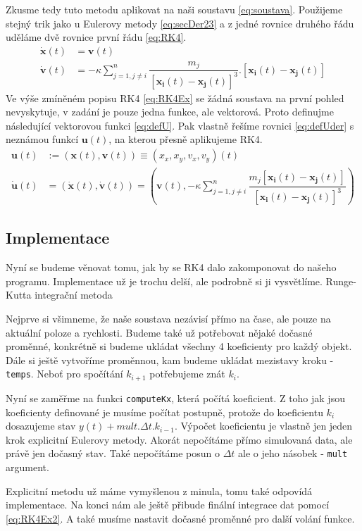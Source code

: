 Zkusme tedy tuto metodu aplikovat na naši soustavu \eqref{eq:soustava}. Použijeme stejný trik jako u Eulerovy metody \eqref{eq:secDer23} a z jedné rovnice druhého řádu uděláme dvě rovnice první řádu \eqref{eq:RK4}.
\begin{subequations}
	\label{eq:RK4}
	\begin{align}
	\label{eq:RK4pos}
	\dot{\boldsymbol{x}}(t)&=\boldsymbol{v}(t)\\
	\label{eq:RK4vel}
	\dot{\boldsymbol{v}}(t)&=-  \kappa \sum_{j=1,j \neq i}^{n}\dfrac{m_j}
	{\left[ \boldsymbol{x_i}(t) - \boldsymbol{x_j}(t)\right] ^3} . 
	\left[ \boldsymbol{x_i}(t) - \boldsymbol{x_j}(t)\right] 
	\end{align}
\end{subequations}
Ve výše zmíněném popisu RK4 \eqref{eq:RK4Ex} se žádná soustava na první pohled nevyskytuje, v zadání je pouze jedna funkce, ale vektorová. Proto definujme následující vektorovou funkci \eqref{eq:defU}. Pak vlastně řešíme rovnici \eqref{eq:defUder} s neznámou funkcí $ \boldsymbol{u}(t) $, na kterou přesně aplikujeme RK4.
\begin{align}
	\label{eq:defU}
	\boldsymbol{u}(t) &:= (\boldsymbol{x}(t),\boldsymbol{v}(t)) \equiv(x_x,x_y,v_x,v_y)(t)\\
	\label{eq:defUder}
	 \boldsymbol{\dot{u}}(t)&=(\dot{\boldsymbol{x}}(t),\dot{\boldsymbol{v}}(t))=
	 (\boldsymbol{v}(t), -\kappa \sum_{j=1,j \neq i}^{n}\dfrac{m_j\left[ \boldsymbol{x_i}(t) - \boldsymbol{x_j}(t)\right]}
	 {\left[ \boldsymbol{x_i}(t) - \boldsymbol{x_j}(t)\right] ^3}
	  )
\end{align}


\subsection{Implementace}
Nyní se budeme věnovat tomu, jak by se RK4 dalo zakomponovat do našeho programu.
Implementace už je trochu delší, ale podrobně si ji vysvětlíme.
{Runge-Kutta integrační metoda}

Nejprve si všimneme, že naše soustava nezávisí přímo na čase, ale pouze na aktuální poloze a rychlosti. Budeme také už potřebovat nějaké dočasné proměnné, konkrétně si budeme ukládat všechny 4 koeficienty pro každý objekt. Dále si ještě vytvoříme proměnnou, kam budeme ukládat mezistavy kroku - \texttt{temps}. Neboť pro spočítání $ k_{i+1} $ potřebujeme znát $ k_{i} $.

Nyní se zaměřme na funkci \texttt{computeKx}, která počítá koeficient. Z toho jak jsou koeficienty definované je musíme počítat postupně, protože do koeficientu $ k_i  $ dosazujeme stav $ y(t)+mult. \Delta t . k_{i-1} $.
Výpočet koeficientu je vlastně jen jeden krok explicitní Eulerovy metody. Akorát nepočítáme přímo simulovaná data, ale právě jen dočasný stav. Také nepočítáme posun o $ \Delta t $ ale o jeho násobek - \texttt{mult} argument.

Explicitní metodu už máme vymyšlenou z minula, tomu také odpovídá implementace.
Na konci nám ale ještě přibude finální integrace dat pomocí \eqref{eq:RK4Ex2}.
A také musíme nastavit dočasné proměnné pro další volání funkce.